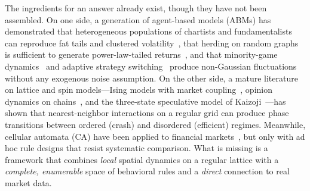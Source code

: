 \documentclass{article}
\theoremstyle{definition}
\theoremstyle{remark}
\begin{document}
The ingredients for an answer already exist, though they have not been assembled. On one
side, a generation of agent-based models (ABMs) has demonstrated that heterogeneous
populations of chartists and fundamentalists can reproduce fat tails and clustered
volatility~\cite{lux1999scaling,bak1997price}, that herding on random graphs is sufficient
to generate power-law-tailed returns~\cite{cont2000herd}, and that minority-game
dynamics~\cite{challet1997minority} and adaptive strategy
switching~\cite{farmer2002price,hommes2006heterogeneous} produce non-Gaussian fluctuations
without any exogenous noise assumption. On the other side, a mature literature on lattice
and spin models---Ising models with market
coupling~\cite{bornholdt2001ising,krawiecki2002volatility}, opinion dynamics on
chains~\cite{sznajd2002simple}, and the three-state speculative model of
Kaizoji~\cite{kaizoji2002speculative}---has shown that nearest-neighbor interactions on a
regular grid can produce phase transitions between ordered (crash) and disordered (efficient)
regimes. Meanwhile, cellular automata (CA) have been applied to financial
markets~\cite{wei2003cellular,qiu2007cellular,yang2019financial}, but only with ad hoc rule
designs that resist systematic comparison. What is missing is a framework that combines
\emph{local} spatial dynamics on a regular lattice with a \emph{complete, enumerable} space
of behavioral rules and a \emph{direct} connection to real market data.
\end{document}
